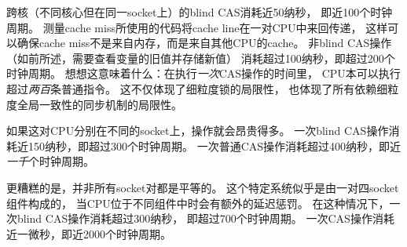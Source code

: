 跨核（不同核心但在同一socket上）的blind CAS消耗近50纳秒，
即近100个时钟周期。
测量cache miss所使用的代码将cache line在一对CPU中来回传递，
这样可以确保cache miss不是来自内存，而是来自其他CPU的cache。
非blind CAS操作（如前所述，需要查看变量的旧值并存储新值）
消耗超过100纳秒，即超过200个时钟周期。
想想这意味着什么：在执行\emph{一次}CAS操作的时间里，
CPU本可以执行超过\emph{两百}条普通指令。
这不仅体现了细粒度锁的局限性，
也体现了所有依赖细粒度全局一致性的同步机制的局限性。

如果这对CPU分别在不同的socket上，操作就会昂贵得多。
一次blind CAS操作消耗近150纳秒，即超过300个时钟周期。
一次普通CAS操作消耗超过400纳秒，即近\emph{一千}个时钟周期。

更糟糕的是，并非所有socket对都是平等的。
这个特定系统似乎是由一对四socket组件构成的，
当CPU位于不同组件中时会有额外的延迟惩罚。
在这种情况下，一次blind CAS操作消耗超过300纳秒，
即超过700个时钟周期。
一次CAS操作消耗近一微秒，即近2000个时钟周期。


